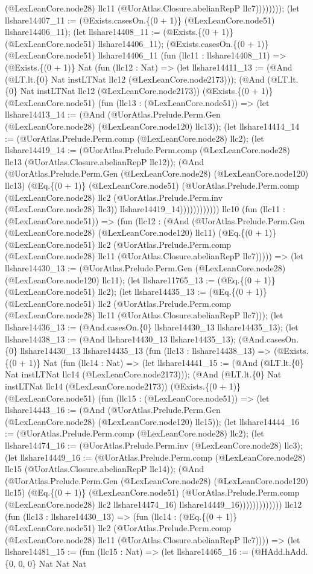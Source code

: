 \documentclass[11pt]{article}
\begin{document}
(@LexLeanCore.node28) llc11 (@UorAtlas.Closure.abelianRepP llc7)))))))); (let llshare14407\_11 := (@Exists.casesOn.\{(0 + 1)\} (@LexLeanCore.node51) llshare14406\_11); (let llshare14408\_11 := (@Exists.\{(0 + 1)\} (@LexLeanCore.node51) llshare14406\_11); (@Exists.casesOn.\{(0 + 1)\} (@LexLeanCore.node51) llshare14406\_11 (fun (llc11 : llshare14408\_11) => (@Exists.\{(0 + 1)\} Nat (fun (llc12 : Nat) => (let llshare14411\_13 := (@And (@LT.lt.\{0\} Nat instLTNat llc12 (@LexLeanCore.node2173))); (@And (@LT.lt.\{0\} Nat instLTNat llc12 (@LexLeanCore.node2173)) (@Exists.\{(0 + 1)\} (@LexLeanCore.node51) (fun (llc13 : (@LexLeanCore.node51)) => (let llshare14413\_14 := (@And (@UorAtlas.Prelude.Perm.Gen (@LexLeanCore.node28) (@LexLeanCore.node120) llc13)); (let llshare14414\_14 := (@UorAtlas.Prelude.Perm.comp (@LexLeanCore.node28) llc2); (let llshare14419\_14 := (@UorAtlas.Prelude.Perm.comp (@LexLeanCore.node28) llc13 (@UorAtlas.Closure.abelianRepP llc12)); (@And (@UorAtlas.Prelude.Perm.Gen (@LexLeanCore.node28) (@LexLeanCore.node120) llc13) (@Eq.\{(0 + 1)\} (@LexLeanCore.node51) (@UorAtlas.Prelude.Perm.comp (@LexLeanCore.node28) llc2 (@UorAtlas.Prelude.Perm.inv (@LexLeanCore.node28) llc3)) llshare14419\_14)))))))))))) llc10 (fun (llc11 : (@LexLeanCore.node51)) => (fun (llc12 : (@And (@UorAtlas.Prelude.Perm.Gen (@LexLeanCore.node28) (@LexLeanCore.node120) llc11) (@Eq.\{(0 + 1)\} (@LexLeanCore.node51) llc2 (@UorAtlas.Prelude.Perm.comp (@LexLeanCore.node28) llc11 (@UorAtlas.Closure.abelianRepP llc7))))) => (let llshare14430\_13 := (@UorAtlas.Prelude.Perm.Gen (@LexLeanCore.node28) (@LexLeanCore.node120) llc11); (let llshare11765\_13 := (@Eq.\{(0 + 1)\} (@LexLeanCore.node51) llc2); (let llshare14435\_13 := (@Eq.\{(0 + 1)\} (@LexLeanCore.node51) llc2 (@UorAtlas.Prelude.Perm.comp (@LexLeanCore.node28) llc11 (@UorAtlas.Closure.abelianRepP llc7))); (let llshare14436\_13 := (@And.casesOn.\{0\} llshare14430\_13 llshare14435\_13); (let llshare14438\_13 := (@And llshare14430\_13 llshare14435\_13); (@And.casesOn.\{0\} llshare14430\_13 llshare14435\_13 (fun (llc13 : llshare14438\_13) => (@Exists.\{(0 + 1)\} Nat (fun (llc14 : Nat) => (let llshare14441\_15 := (@And (@LT.lt.\{0\} Nat instLTNat llc14 (@LexLeanCore.node2173))); (@And (@LT.lt.\{0\} Nat instLTNat llc14 (@LexLeanCore.node2173)) (@Exists.\{(0 + 1)\} (@LexLeanCore.node51) (fun (llc15 : (@LexLeanCore.node51)) => (let llshare14443\_16 := (@And (@UorAtlas.Prelude.Perm.Gen (@LexLeanCore.node28) (@LexLeanCore.node120) llc15)); (let llshare14444\_16 := (@UorAtlas.Prelude.Perm.comp (@LexLeanCore.node28) llc2); (let llshare14474\_16 := (@UorAtlas.Prelude.Perm.inv (@LexLeanCore.node28) llc3); (let llshare14449\_16 := (@UorAtlas.Prelude.Perm.comp (@LexLeanCore.node28) llc15 (@UorAtlas.Closure.abelianRepP llc14)); (@And (@UorAtlas.Prelude.Perm.Gen (@LexLeanCore.node28) (@LexLeanCore.node120) llc15) (@Eq.\{(0 + 1)\} (@LexLeanCore.node51) (@UorAtlas.Prelude.Perm.comp (@LexLeanCore.node28) llc2 llshare14474\_16) llshare14449\_16))))))))))))) llc12 (fun (llc13 : llshare14430\_13) => (fun (llc14 : (@Eq.\{(0 + 1)\} (@LexLeanCore.node51) llc2 (@UorAtlas.Prelude.Perm.comp (@LexLeanCore.node28) llc11 (@UorAtlas.Closure.abelianRepP llc7)))) => (let llshare14481\_15 := (fun (llc15 : Nat) => (let llshare14465\_16 := (@HAdd.hAdd.\{0, 0, 0\} Nat Nat Nat 
\end{document}
